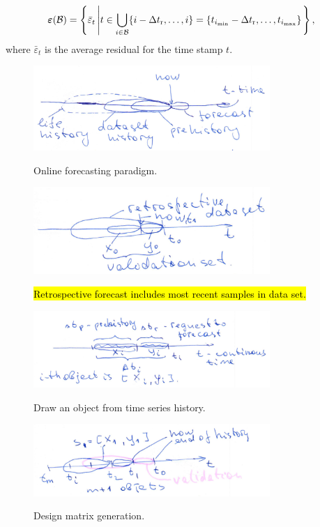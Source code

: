 \documentclass[12pt]{article}
\begin{document}
\[{\boldsymbol{\varepsilon}}({\mathcal{B}}) = \left\{\bar{\varepsilon}_t \left| t \in \bigcup_{i \in {\mathcal{B}}} \{i-\Delta t_\text{r}, \dots, i\} = \{t_{i_{\min}} - \Delta t_\text{r}, \dots, t_{i_{\max}}\}\right.\right\}, \]
where $\bar{\varepsilon}_t$ is the average residual for the time stamp $t$.
\begin{figure}[!ht]
\centering\includegraphics[width=0.8\textwidth]{online_forecasting_paradigm.png}
\label{fg:online_frc}
\caption{Online forecasting paradigm.}
\end{figure}


\begin{figure}[!ht]
\centering\includegraphics[width=0.8\textwidth]{retrospective_validation.png}
\label{fg:retrospective}
\caption{\hl{Retrospective forecast includes most recent samples in data set.}}
\end{figure}


\begin{figure}[!ht]
\centering\includegraphics[width=0.8\textwidth]{draw_object.png}
\label{fg:draw}
\caption{Draw an object from time series history.}
\end{figure}
\begin{figure}[!ht]
\centering\includegraphics[width=0.8\textwidth]{design_matrix_generation.png}
\label{fg:design}
\caption{Design matrix generation.}
\end{figure}
\end{document}
